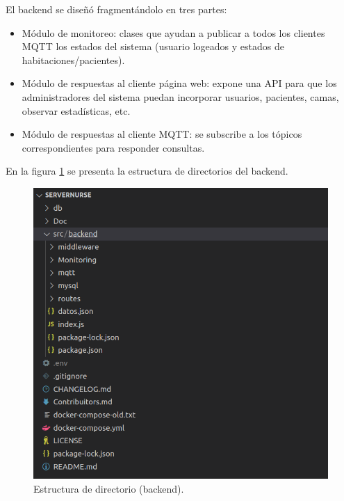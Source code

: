 El backend se diseñó fragmentándolo en tres partes:

\begin{itemize}
\item Módulo de monitoreo: clases que ayudan a publicar a todos los clientes MQTT los estados del sistema (usuario logeados y estados de habitaciones/pacientes). 
\item Módulo de respuestas al cliente página web: expone una API para que los administradores del sistema puedan incorporar usuarios, pacientes, camas, observar estadísticas, etc.
\item Módulo de respuestas al cliente MQTT: se subscribe a los tópicos correspondientes para responder consultas.
\end{itemize}

En la figura \ref{fig:Estructura de directorio (backend)} se presenta la estructura de directorios del backend.

\begin{figure}[ht]
	\centering
	\includegraphics[scale=.45]{./Figures/projectStructure.png}
	\caption{Estructura de directorio (backend).}
	\label{fig:Estructura de directorio (backend)}
\end{figure}

